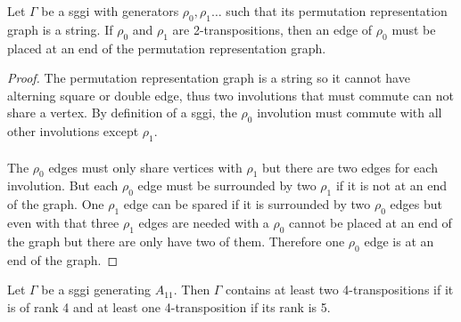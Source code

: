 \begin{lemma}\label{rho0atEnd}
  Let $\Gamma$ be a sggi with generators $\rho_0, \rho_1 \dots$ such that its permutation representation graph is a string. If $\rho_0$ and $\rho_1$ are 2-transpositions, then an edge of $\rho_0$ must be placed at an end of the permutation representation graph.
\end{lemma}

\begin{proof}
  The permutation representation graph is a string so it cannot have alterning square or double edge, thus two involutions that must commute can not share a vertex. By definition of a sggi, the $\rho_0$ involution must commute with all other involutions except $\rho_1$.

  \paragraph{}
  The $\rho_0$ edges must only share vertices with $\rho_1$ but there are two edges for each involution. But each $\rho_0$ edge must be surrounded by two $\rho_1$ if it is not at an end of the graph. One $\rho_1$ edge can be spared if it is surrounded by two $\rho_0$ edges but even with that three $\rho_1$ edges are needed with a $\rho_0$ cannot be placed at an end of the graph but there are only have two of them. Therefore one $\rho_0$ edge is at an end of the graph.
\end{proof}

\begin{lemma}
  \label{min-4-trans}
  Let $\Gamma$ be a sggi generating $A_{11}$. Then $\Gamma$ contains at least two 4-transpositions if it is of rank 4 and at least one 4-transposition if its rank is 5.
\end{lemma}

